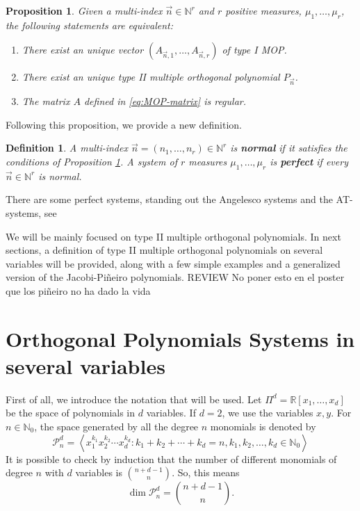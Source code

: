 \documentclass[12pt,a4]{article}
\theoremstyle{plain}
\newtheorem{proposition}[theorem]{Proposition}
\newtheorem{definition}[theorem]{Definition}
\newcommand{\R}[0]{\mathbb{R}}
\newcommand{\N}[0]{\mathbb{N}}
\newcommand{\cred}[1]{{\color{red} #1}}
\begin{document}
\begin{proposition}
    \label{prop:existence-of-MOP}
    Given a multi-index $\vec n\in\N^r$ and $r$ positive measures, $\mu_1,\dots,\mu_r$, the following statements are equivalent:
    \begin{enumerate}
        \item There exist an unique vector $(A_{\vec n,1}, \dots, A_{\vec n,r})$ of type I MOP.
        \item There exist an unique type II multiple orthogonal polynomial $P_{\vec n}$.
        \item The matrix $A$ defined in \eqref{eq:MOP-matrix} is regular.
    \end{enumerate}
\end{proposition}

Following this proposition, we provide a new definition.

\begin{definition}
    A multi-index $\vec n = (n_1,\dots,n_r)\in\N^r$ is \textbf{normal} if it satisfies the conditions of Proposition \ref{prop:existence-of-MOP}.
    A system of $r$ measures $\mu_1,\dots,\mu_r$ is \textbf{perfect} if every $\vec n\in\N^r$ is normal.
\end{definition}

There are some perfect systems, standing out the Angelesco systems and the AT-systems, see \cite[Sections 23.1.1 and 23.1.2]{Ismail}

We will be mainly focused on type II multiple orthogonal polynomials. In next sections, a definition of type II multiple orthogonal polynomials on several variables will be provided, along with a few simple examples and a generalized version of the Jacobi-Piñeiro polynomials. 
\cred{REVIEW No poner esto en el poster que los piñeiro no ha dado la vida}

\section{Orthogonal Polynomials Systems in several variables}

First of all, we introduce the notation that will be used. Let $\Pi^d=\R[x_1,\dots,x_d]$ be the space of polynomials in $d$ variables. If $d=2$, we use the variables $x,y$. For $n\in\N_0$, the space generated by all the degree $n$ monomials is denoted by 
$$
\mathcal{P}_n^d = \left\langle x_1^{k_1} x_2^{k_2} \cdots x_d^{k_d}: k_1+k_2+\cdots +k_d = n, k_1,k_2,\dots,k_d\in\N_0\right\rangle
$$
It is possible to check by induction that the number of different monomials of degree $n$ with $d$ variables is $\displaystyle\binom{n+d-1}{n}$. So, this means
$$
\dim \mathcal{P}_n^d = \binom{n+d-1}{n}.
$$
\end{document}
